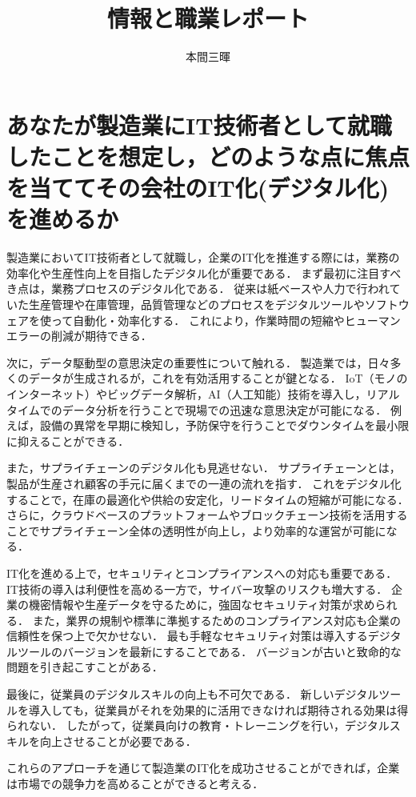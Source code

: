 \documentclass[titlepage,a4paper]{jsarticle}
\title{情報と職業レポート}
\author{本間三暉}
\begin{document}
\maketitle
\section*{あなたが製造業にIT技術者として就職したことを想定し，どのような点に焦点を当ててその会社のIT化(デジタル化)を進めるか}
%
製造業においてIT技術者として就職し，企業のIT化を推進する際には，業務の効率化や生産性向上を目指したデジタル化が重要である．
まず最初に注目すべき点は，業務プロセスのデジタル化である．
従来は紙ベースや人力で行われていた生産管理や在庫管理，品質管理などのプロセスをデジタルツールやソフトウェアを使って自動化・効率化する．
これにより，作業時間の短縮やヒューマンエラーの削減が期待できる．

次に，データ駆動型の意思決定の重要性について触れる．
製造業では，日々多くのデータが生成されるが，これを有効活用することが鍵となる．
IoT（モノのインターネット）やビッグデータ解析，AI（人工知能）技術を導入し，リアルタイムでのデータ分析を行うことで現場での迅速な意思決定が可能になる．
例えば，設備の異常を早期に検知し，予防保守を行うことでダウンタイムを最小限に抑えることができる．

また，サプライチェーンのデジタル化も見逃せない．
サプライチェーンとは，製品が生産され顧客の手元に届くまでの一連の流れを指す．
これをデジタル化することで，在庫の最適化や供給の安定化，リードタイムの短縮が可能になる．
さらに，クラウドベースのプラットフォームやブロックチェーン技術を活用することでサプライチェーン全体の透明性が向上し，より効率的な運営が可能になる．

IT化を進める上で，セキュリティとコンプライアンスへの対応も重要である．
IT技術の導入は利便性を高める一方で，サイバー攻撃のリスクも増大する．
企業の機密情報や生産データを守るために，強固なセキュリティ対策が求められる．
また，業界の規制や標準に準拠するためのコンプライアンス対応も企業の信頼性を保つ上で欠かせない．
最も手軽なセキュリティ対策は導入するデジタルツールのバージョンを最新にすることである．
バージョンが古いと致命的な問題を引き起こすことがある．

最後に，従業員のデジタルスキルの向上も不可欠である．
新しいデジタルツールを導入しても，従業員がそれを効果的に活用できなければ期待される効果は得られない．
したがって，従業員向けの教育・トレーニングを行い，デジタルスキルを向上させることが必要である．

これらのアプローチを通じて製造業のIT化を成功させることができれば，企業は市場での競争力を高めることができると考える．
\end{document}
